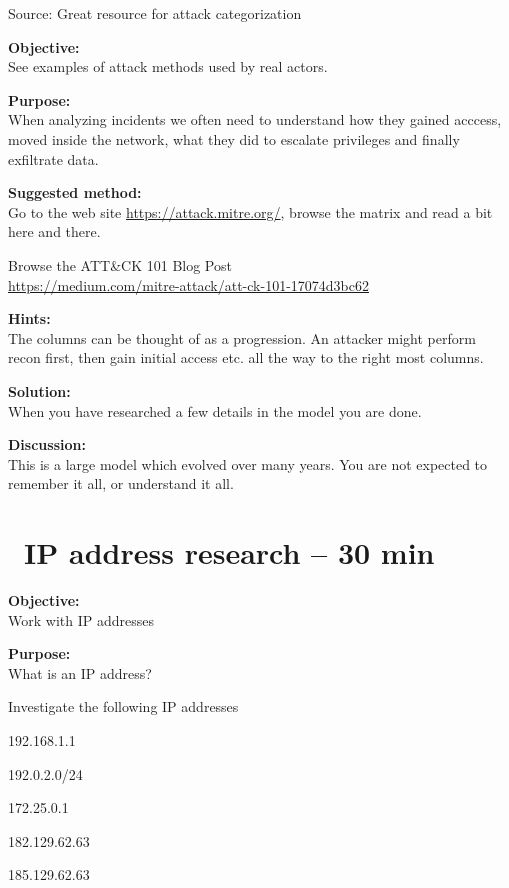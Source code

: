 \documentclass[a4paper,11pt,notitlepage]{report}
\begin{document}

Source:  Great resource for attack categorization



{\bf Objective:}\\
See examples of attack methods used by real actors.


{\bf Purpose:}\\
When analyzing incidents we often need to understand how they gained acccess, moved inside the network, what they did to escalate privileges and finally exfiltrate data.

{\bf Suggested method:}\\
Go to the web site \url{https://attack.mitre.org/}, browse the matrix and read a bit here and there.

Browse the ATT\&CK 101 Blog Post\\
\url{https://medium.com/mitre-attack/att-ck-101-17074d3bc62}


{\bf Hints:}\\
The columns can be thought of as a progression. An attacker might perform recon first, then gain initial access etc. all the way to the right most columns.

{\bf Solution:}\\
When you have researched a few details in the model you are done.

{\bf Discussion:}\\
This is a large model which evolved over many years. You are not expected to remember it all, or understand it all.





\chapter{\faExclamationTriangle\ IP address research -- 30 min}
\label{ex:ip-address-research}

{\bf Objective:}\\
Work with IP addresses

{\bf Purpose:}\\
What is an IP address?

Investigate the following IP addresses
\begin{list2}
\item 192.168.1.1
\item 192.0.2.0/24
\item 172.25.0.1
\item 182.129.62.63
\item 185.129.62.63
\end{list2}
\end{document}
